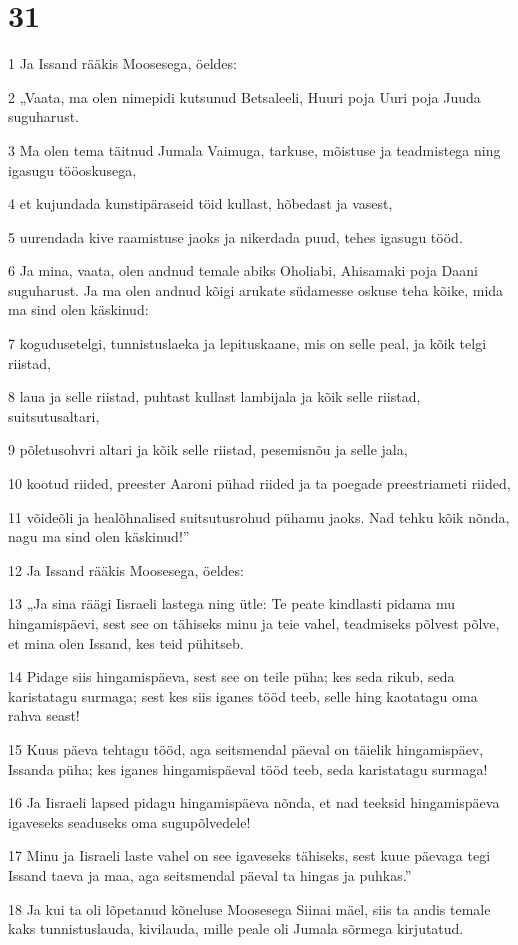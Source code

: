 \chapter{31}

\par 1 Ja Issand rääkis Moosesega, öeldes:
\par 2 „Vaata, ma olen nimepidi kutsunud Betsaleeli, Huuri poja Uuri poja Juuda suguharust.
\par 3 Ma olen tema täitnud Jumala Vaimuga, tarkuse, mõistuse ja teadmistega ning igasugu tööoskusega,
\par 4 et kujundada kunstipäraseid töid kullast, hõbedast ja vasest,
\par 5 uurendada kive raamistuse jaoks ja nikerdada puud, tehes igasugu tööd.
\par 6 Ja mina, vaata, olen andnud temale abiks Oholiabi, Ahisamaki poja Daani suguharust. Ja ma olen andnud kõigi arukate südamesse oskuse teha kõike, mida ma sind olen käskinud:
\par 7 kogudusetelgi, tunnistuslaeka ja lepituskaane, mis on selle peal, ja kõik telgi riistad,
\par 8 laua ja selle riistad, puhtast kullast lambijala ja kõik selle riistad, suitsutusaltari,
\par 9 põletusohvri altari ja kõik selle riistad, pesemisnõu ja selle jala,
\par 10 kootud riided, preester Aaroni pühad riided ja ta poegade preestriameti riided,
\par 11 võideõli ja healõhnalised suitsutusrohud pühamu jaoks. Nad tehku kõik nõnda, nagu ma sind olen käskinud!”
\par 12 Ja Issand rääkis Moosesega, öeldes:
\par 13 „Ja sina räägi Iisraeli lastega ning ütle: Te peate kindlasti pidama mu hingamispäevi, sest see on tähiseks minu ja teie vahel, teadmiseks põlvest põlve, et mina olen Issand, kes teid pühitseb.
\par 14 Pidage siis hingamispäeva, sest see on teile püha; kes seda rikub, seda karistatagu surmaga; sest kes siis iganes tööd teeb, selle hing kaotatagu oma rahva seast!
\par 15 Kuus päeva tehtagu tööd, aga seitsmendal päeval on täielik hingamispäev, Issanda püha; kes iganes hingamispäeval tööd teeb, seda karistatagu surmaga!
\par 16 Ja Iisraeli lapsed pidagu hingamispäeva nõnda, et nad teeksid hingamispäeva igaveseks seaduseks oma sugupõlvedele!
\par 17 Minu ja Iisraeli laste vahel on see igaveseks tähiseks, sest kuue päevaga tegi Issand taeva ja maa, aga seitsmendal päeval ta hingas ja puhkas.”
\par 18 Ja kui ta oli lõpetanud kõneluse Moosesega Siinai mäel, siis ta andis temale kaks tunnistuslauda, kivilauda, mille peale oli Jumala sõrmega kirjutatud.

